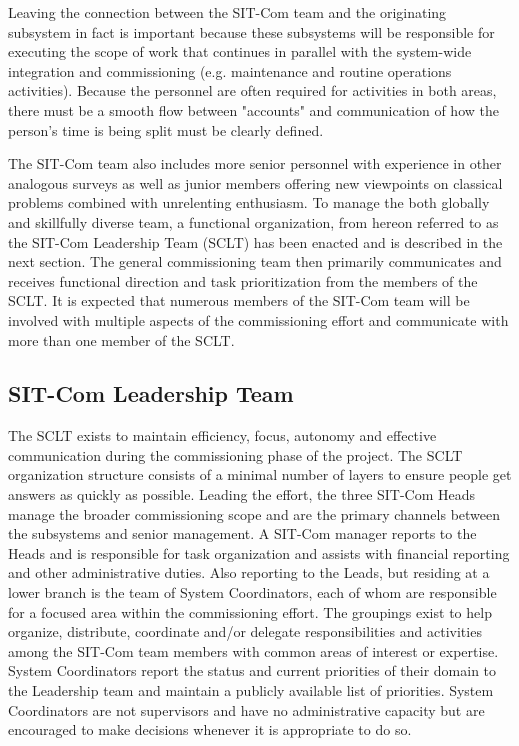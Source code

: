 \documentclass[SE,toc]{lsstdoc}
\begin{document}
Leaving the connection between the SIT-Com team and the originating subsystem in fact is important because these subsystems will be responsible for executing the scope of work that continues in parallel with the system-wide integration and commissioning (e.g. maintenance and routine operations activities).
Because the personnel are often required for activities in both areas, there must be a smooth flow between "accounts" and communication of how the person's time is being split must be clearly defined.

The SIT-Com team also includes more senior personnel with experience in other analogous surveys as well as junior members offering new viewpoints on classical problems combined with unrelenting enthusiasm.
To manage the both globally and skillfully diverse team, a functional organization, from hereon referred to as the SIT-Com Leadership Team (SCLT) has been enacted and is described in the next section.
The general commissioning team then primarily communicates and receives functional direction and task prioritization from the members of the SCLT.
It is expected that numerous members of the SIT-Com team will be involved with multiple aspects of the commissioning effort and communicate with more than one member of the SCLT.

\subsection{SIT-Com Leadership Team}
\label{sec:SCLT}

The SCLT exists to maintain efficiency, focus, autonomy and effective communication during the commissioning phase of the project.
The SCLT organization structure consists of a minimal number of layers to ensure people get answers as quickly as possible.
Leading the effort, the three SIT-Com Heads manage the broader commissioning scope and are the primary channels between the subsystems and senior management.
A SIT-Com manager reports to the Heads and is responsible for task organization and assists with financial reporting and other administrative duties.
Also reporting to the Leads, but residing at a lower branch is the team of System Coordinators, each of whom are responsible for a focused area within the commissioning effort.
The groupings exist to help organize, distribute, coordinate and/or delegate responsibilities and activities among the SIT-Com team members with common areas of interest or expertise.
System Coordinators report the status and current priorities of their domain to the Leadership team and maintain a publicly available list of priorities.
System Coordinators are not supervisors and have no administrative capacity but are encouraged to make decisions whenever it is appropriate to do so.
\end{document}
